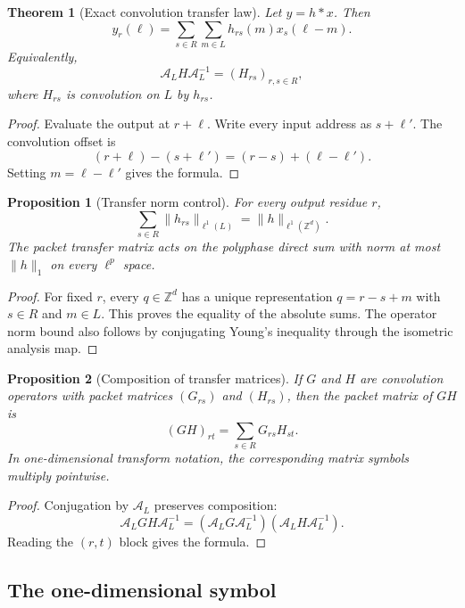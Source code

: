 \documentclass[11pt,letterpaper]{article}
\newtheorem{theorem}{Theorem}[section]
\theoremstyle{plain}
\newtheorem{proposition}[proposition]{Proposition}
\theoremstyle{plain}
\theoremstyle{plain}
\theoremstyle{definition}
\theoremstyle{definition}
\theoremstyle{definition}
\theoremstyle{definition}
\theoremstyle{remark}
\theoremstyle{remark}
\theoremstyle{remark}
\theoremstyle{remark}
\newcommand{\ZZ}{\mathbb Z}
\newcommand{\Acal}{\mathcal A}
\begin{document}
\begin{theorem}[Exact convolution transfer law]\label{thm:convolution_transfer}
Let \(y=h*x\). Then
\[
y_r(\ell)
=
\sum_{s\in R}\sum_{m\in L}h_{rs}(m)x_s(\ell-m).
\]
Equivalently,
\[
\Acal_LH\Acal_L^{-1}
=
(H_{rs})_{r,s\in R},
\]
where \(H_{rs}\) is convolution on \(L\) by \(h_{rs}\).
\end{theorem}

\begin{proof}
Evaluate the output at \(r+\ell\). Write every input address as \(s+\ell'\). The convolution offset is
\[
(r+\ell)-(s+\ell')
=(r-s)+(\ell-\ell').
\]
Setting \(m=\ell-\ell'\) gives the formula.
\end{proof}

\begin{proposition}[Transfer norm control]\label{prop:transfer_norm_control}
For every output residue \(r\),
\[
\sum_{s\in R}\|h_{rs}\|_{\ell^1(L)}
=
\|h\|_{\ell^1(\ZZ^d)}.
\]
The packet transfer matrix acts on the polyphase direct sum with norm at most \(\|h\|_1\) on every \(\ell^p\) space.
\end{proposition}

\begin{proof}
For fixed \(r\), every \(q\in\ZZ^d\) has a unique representation \(q=r-s+m\) with \(s\in R\) and \(m\in L\). This proves the equality of the absolute sums. The operator norm bound also follows by conjugating Young's inequality through the isometric analysis map.
\end{proof}

\begin{proposition}[Composition of transfer matrices]\label{prop:transfer_composition}
If \(G\) and \(H\) are convolution operators with packet matrices \((G_{rs})\) and \((H_{rs})\), then the packet matrix of \(GH\) is
\[
(GH)_{rt}
=
\sum_{s\in R}G_{rs}H_{st}.
\]
In one-dimensional transform notation, the corresponding matrix symbols multiply pointwise.
\end{proposition}

\begin{proof}
Conjugation by \(\Acal_L\) preserves composition:
\[
\Acal_LGH\Acal_L^{-1}
=
(\Acal_LG\Acal_L^{-1})(\Acal_LH\Acal_L^{-1}).
\]
Reading the \((r,t)\) block gives the formula.
\end{proof}

\subsection{The one-dimensional symbol}
\end{document}
